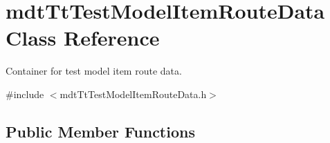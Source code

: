 \hypertarget{classmdt_tt_test_model_item_route_data}{\section{mdt\-Tt\-Test\-Model\-Item\-Route\-Data Class Reference}
\label{classmdt_tt_test_model_item_route_data}
}


Container for test model item route data.  




{\ttfamily \#include $<$mdt\-Tt\-Test\-Model\-Item\-Route\-Data.\-h$>$}

\subsection*{Public Member Functions}
